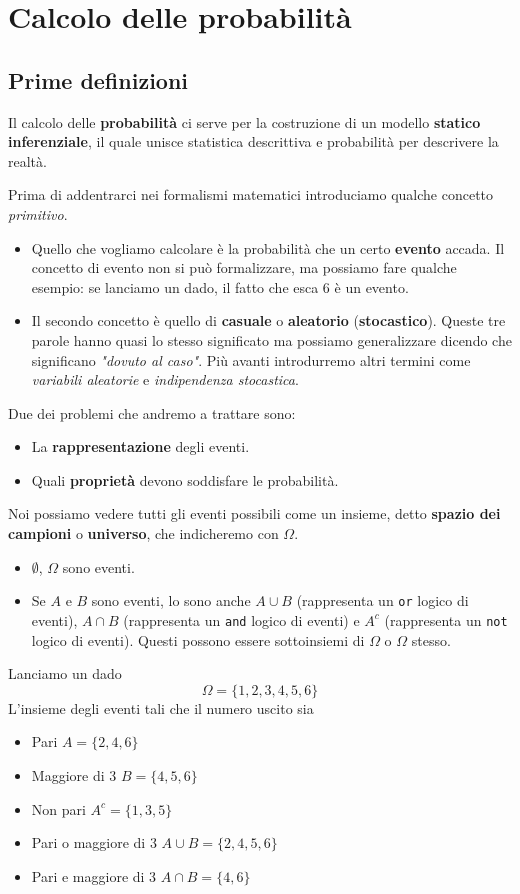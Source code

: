 \part{Calcolo delle probabilità}

\chapter{Prime definizioni}
Il calcolo delle \textbf{probabilità} ci serve per la costruzione di un modello
\textbf{statico inferenziale}, il quale unisce statistica descrittiva e probabilità per descrivere la
realtà.

Prima di addentrarci nei formalismi matematici introduciamo qualche concetto \emph{primitivo}.
\begin{itemize}
	\item Quello che vogliamo calcolare è la probabilità che un certo \textbf{evento} accada. Il concetto
	      di evento non si può formalizzare, ma possiamo fare qualche esempio: se lanciamo un dado, il
	      fatto che esca 6 è un evento.
	\item Il secondo concetto è quello di \textbf{casuale} o \textbf{aleatorio} (\textbf{stocastico}).
	      Queste tre parole hanno quasi lo stesso significato ma possiamo generalizzare dicendo che
	      significano \emph{"dovuto al caso"}. Più avanti introdurremo altri termini come
	      \emph{variabili aleatorie} e \emph{indipendenza stocastica}.
\end{itemize}
Due dei problemi che andremo a trattare sono:
\begin{itemize}
	\item La \textbf{rappresentazione} degli eventi.
	\item Quali \textbf{proprietà} devono soddisfare le probabilità.
\end{itemize}
Noi possiamo vedere tutti gli eventi possibili come un insieme, detto \textbf{spazio dei campioni} o
\textbf{universo}, che indicheremo con $\Omega$.
\begin{itemize}
	\item $\emptyset$, $\Omega$ sono eventi.
	\item Se $A$ e $B$ sono eventi, lo sono anche $A \cup B$ (rappresenta un \verb|or| logico di eventi),
	      $A \cap B$ (rappresenta un \verb|and| logico di eventi) e $A^c$ (rappresenta un \verb|not| logico
	      di eventi). Questi possono essere sottoinsiemi di $\Omega$ o $\Omega$ stesso.
\end{itemize}

\begin{example}
	Lanciamo un dado
	\[ \Omega = \{ 1, 2, 3, 4, 5, 6 \} \]
	L'insieme degli eventi tali che il numero uscito sia
	\begin{itemize}
		\item Pari $A = \{ 2, 4, 6 \}$
		\item Maggiore di 3 $B = \{ 4, 5, 6 \}$
		\item Non pari $A^c = \{ 1, 3, 5 \}$
		\item Pari o maggiore di 3 $A \cup B = \{ 2, 4, 5, 6 \}$
		\item Pari e maggiore di 3 $A \cap B = \{ 4, 6 \}$
	\end{itemize}
\end{example}

